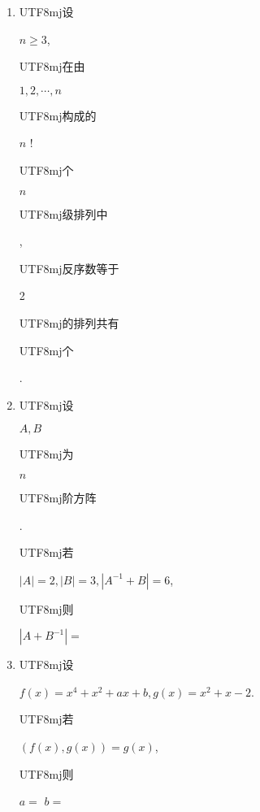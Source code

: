 \documentclass[10pt]{article}
\begin{document}
\begin{enumerate}
  \item \begin{CJK}{UTF8}{mj}设\end{CJK} $n \geqslant 3$, \begin{CJK}{UTF8}{mj}在由\end{CJK} $1,2, \cdots, n$ \begin{CJK}{UTF8}{mj}构成的\end{CJK} $n$ ! \begin{CJK}{UTF8}{mj}个\end{CJK} $n$ \begin{CJK}{UTF8}{mj}级排列中\end{CJK}, \begin{CJK}{UTF8}{mj}反序数等于\end{CJK} 2 \begin{CJK}{UTF8}{mj}的排列共有\end{CJK} \begin{CJK}{UTF8}{mj}个\end{CJK}.

  \item \begin{CJK}{UTF8}{mj}设\end{CJK} $A, B$ \begin{CJK}{UTF8}{mj}为\end{CJK} $n$ \begin{CJK}{UTF8}{mj}阶方阵\end{CJK}. \begin{CJK}{UTF8}{mj}若\end{CJK} $|A|=2,|B|=3,\left|A^{-1}+B\right|=6$, \begin{CJK}{UTF8}{mj}则\end{CJK} $\left|A+B^{-1}\right|=$

  \item \begin{CJK}{UTF8}{mj}设\end{CJK} $f(x)=x^{4}+x^{2}+a x+b, g(x)=x^{2}+x-2$. \begin{CJK}{UTF8}{mj}若\end{CJK} $(f(x), g(x))=g(x)$, \begin{CJK}{UTF8}{mj}则\end{CJK} $a=$ $b=$


\end{enumerate}
\end{document}
